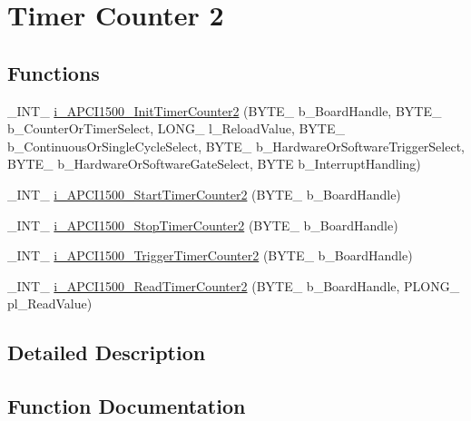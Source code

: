 \hypertarget{group___timer2_cmp_d_l_l}{}\section{Timer Counter 2}
\label{group___timer2_cmp_d_l_l}
\subsection*{Functions}
\begin{DoxyCompactItemize}
\item 
\+\_\+\+I\+N\+T\+\_\+ \mbox{\hyperlink{group___timer2_cmp_d_l_l_ga4673c7b54cdcd06a3e36811c63be3ea0}{i\+\_\+\+A\+P\+C\+I1500\+\_\+\+Init\+Timer\+Counter2}} (B\+Y\+T\+E\+\_\+ b\+\_\+\+Board\+Handle, B\+Y\+T\+E\+\_\+ b\+\_\+\+Counter\+Or\+Timer\+Select, L\+O\+N\+G\+\_\+ l\+\_\+\+Reload\+Value, B\+Y\+T\+E\+\_\+ b\+\_\+\+Continuous\+Or\+Single\+Cycle\+Select, B\+Y\+T\+E\+\_\+ b\+\_\+\+Hardware\+Or\+Software\+Trigger\+Select, B\+Y\+T\+E\+\_\+ b\+\_\+\+Hardware\+Or\+Software\+Gate\+Select, B\+Y\+TE b\+\_\+\+Interrupt\+Handling)
\item 
\+\_\+\+I\+N\+T\+\_\+ \mbox{\hyperlink{group___timer2_cmp_d_l_l_ga9ed00fc5a7c2c5bea44b7b87b6236303}{i\+\_\+\+A\+P\+C\+I1500\+\_\+\+Start\+Timer\+Counter2}} (B\+Y\+T\+E\+\_\+ b\+\_\+\+Board\+Handle)
\item 
\+\_\+\+I\+N\+T\+\_\+ \mbox{\hyperlink{group___timer2_cmp_d_l_l_gad5300491a1cb90a586d1e88640dd738d}{i\+\_\+\+A\+P\+C\+I1500\+\_\+\+Stop\+Timer\+Counter2}} (B\+Y\+T\+E\+\_\+ b\+\_\+\+Board\+Handle)
\item 
\+\_\+\+I\+N\+T\+\_\+ \mbox{\hyperlink{group___timer2_cmp_d_l_l_ga10ef9b94e9fdfe7e2203b1d72833a045}{i\+\_\+\+A\+P\+C\+I1500\+\_\+\+Trigger\+Timer\+Counter2}} (B\+Y\+T\+E\+\_\+ b\+\_\+\+Board\+Handle)
\item 
\+\_\+\+I\+N\+T\+\_\+ \mbox{\hyperlink{group___timer2_cmp_d_l_l_gaa6b537ea662254d04e00e61b25208cb4}{i\+\_\+\+A\+P\+C\+I1500\+\_\+\+Read\+Timer\+Counter2}} (B\+Y\+T\+E\+\_\+ b\+\_\+\+Board\+Handle, P\+L\+O\+N\+G\+\_\+ pl\+\_\+\+Read\+Value)
\end{DoxyCompactItemize}


\subsection{Detailed Description}


\subsection{Function Documentation}
\mbox{\label{group___timer2_cmp_d_l_l_ga4673c7b54cdcd06a3e36811c63be3ea0}} 
